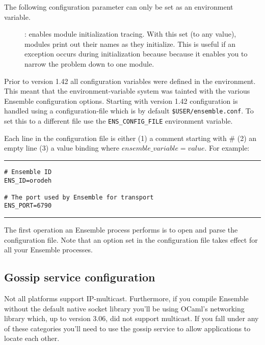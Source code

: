 The following configuration parameter can only be set as an
environment variable.
\begin{description}
\item
[]: enables module initialization tracing.  With this set (to
any value), modules print out their names as they initialize.  This is useful
if an exception  occurs during initialization because because it
enables you to narrow the problem down to one module.
\end{description}

Prior to version 1.42 all configuration variables were defined in the
environment. This meant that the environment-variable system was
tainted with the various Ensemble configuration options. Starting with
version 1.42 configuration is handled using a configuration-file which is
by default {\tt \$USER/ensemble.conf}. To set this to a
different file use the {\tt ENS\_CONFIG\_FILE} environment variable. 

Each line in the configuration file is either (1) a comment starting with \# (2) an
empty line (3) a value binding where $ensemble\_variable=value$. For
example: 

\vspace{1mm}
\hrule{}
\begin{verbatim}
# Ensemble ID
ENS_ID=orodeh

# The port used by Ensemble for transport
ENS_PORT=6790
\end{verbatim}
\hrule{}
\vspace{1mm}

The first operation an Ensemble process performs is to open and parse
the configuration file. Note that an option set in the configuration
file takes effect for all your Ensemble processes.

\subsection{Gossip service configuration}
Not all platforms support IP-multicast. Furthermore, if you compile
Ensemble without the default native socket library you'll be using
OCaml's networking library which, up to version 3.06, did not 
support multicast. If you fall under any of these categories you'll need to
use the gossip service to allow applications to locate each other.

